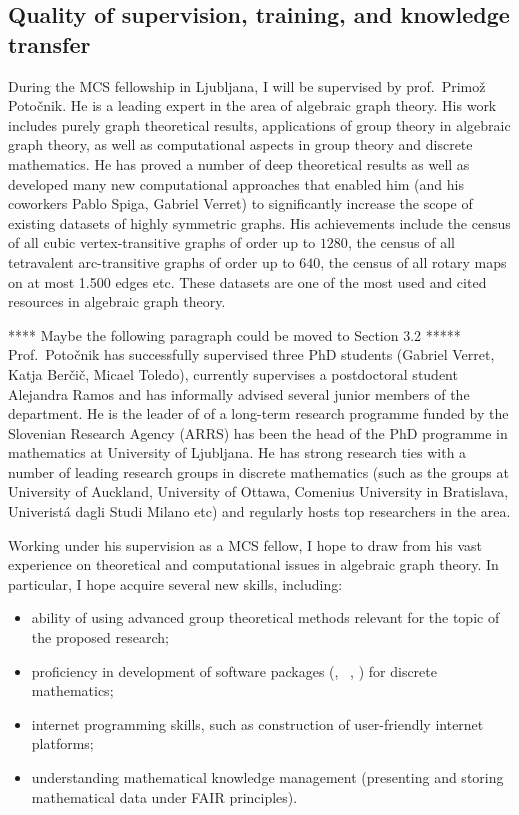 \subsection{Quality of supervision, training, and knowledge transfer}
\label{sec:training}

During the MCS fellowship in Ljubljana, I will be supervised by prof.\ Primož Potočnik. 
He is a leading expert in the area of algebraic graph theory. His work includes purely graph theoretical
results, applications of group theory in algebraic graph theory, as well as computational aspects in group theory and discrete mathematics.
He has proved a number of deep theoretical results as well as developed many new computational approaches that enabled him (and his coworkers Pablo Spiga, Gabriel Verret) to significantly increase the scope of existing datasets of highly symmetric graphs. His achievements include the census of all
cubic vertex-transitive graphs of order up to $1280$, the census of all tetravalent arc-transitive graphs of order up to $640$, the census of all
rotary maps on at most 1.500 edges etc. These datasets are one of the most used and cited resources in algebraic graph theory.

**** Maybe the following paragraph could be moved to Section 3.2 *****
Prof.\ Potočnik has successfully supervised three PhD students (Gabriel Verret, Katja Berčič, Micael Toledo), currently supervises
a postdoctoral student Alejandra Ramos and has informally advised several junior members of the department. He is the leader of
of a long-term research programme funded by the Slovenian Research Agency (ARRS) has been the head of the PhD programme in mathematics at
University of Ljubljana. He has strong research ties with a number of leading research groups in discrete mathematics (such as the groups at University of Auckland, University of Ottawa, Comenius University in Bratislava, Univerist\'a dagli Studi Milano etc) and regularly hosts top researchers in the area.

Working under his supervision as a MCS fellow, I hope to draw from his vast experience on theoretical and computational issues in algebraic graph theory. In particular, I hope acquire several new skills, including:
\begin{itemize}
\setlength{\itemsep}{0pt}
\item ability of using advanced group theoretical methods relevant for the topic of the proposed research;
\item proficiency in development of software packages (\gap, \sage\ , \magma) for discrete mathematics;
\item internet programming skills, such as construction of user-friendly internet platforms;
\item understanding mathematical knowledge management (presenting and storing mathematical data under FAIR principles).
\end{itemize}

